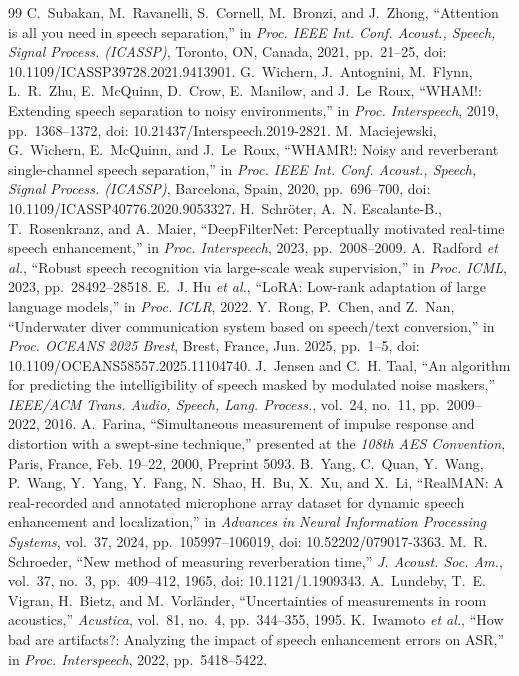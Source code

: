 \documentclass[conference]{IEEEtran}
\begin{document}
\begin{thebibliography}{99}
 C.~Subakan, M.~Ravanelli, S.~Cornell, M.~Bronzi, and J.~Zhong, ``Attention is all you need in speech separation,'' in \emph{Proc. IEEE Int. Conf. Acoust., Speech, Signal Process. (ICASSP)}, Toronto, ON, Canada, 2021, pp.~21--25, doi: 10.1109/ICASSP39728.2021.9413901.
 G.~Wichern, J.~Antognini, M.~Flynn, L.~R.~Zhu, E.~McQuinn, D.~Crow, E.~Manilow, and J.~Le~Roux, ``WHAM!: Extending speech separation to noisy environments,'' in \emph{Proc. Interspeech}, 2019, pp.~1368--1372, doi: 10.21437/Interspeech.2019-2821.
 M.~Maciejewski, G.~Wichern, E.~McQuinn, and J.~Le~Roux, ``WHAMR!: Noisy and reverberant single-channel speech separation,'' in \emph{Proc. IEEE Int. Conf. Acoust., Speech, Signal Process. (ICASSP)}, Barcelona, Spain, 2020, pp.~696--700, doi: 10.1109/ICASSP40776.2020.9053327.
 H.~Schr\"oter, A.~N. Escalante-B., T.~Rosenkranz, and A.~Maier,
``DeepFilterNet: Perceptually motivated real-time speech enhancement,'' in \emph{Proc. Interspeech},
2023, pp.~2008--2009.
 A.~Radford \emph{et al.}, ``Robust speech recognition via large-scale weak supervision,'' in \emph{Proc. ICML}, 2023,
pp.~28492--28518.
 E.~J. Hu \emph{et al.}, ``LoRA: Low-rank adaptation of large language models,'' in
\emph{Proc. ICLR}, 2022.
 Y.~Rong, P.~Chen, and Z.~Nan, ``Underwater diver communication system based on speech/text conversion,'' in \emph{Proc. OCEANS 2025 Brest}, Brest, France, Jun. 2025, pp.~1--5, doi: 10.1109/OCEANS58557.2025.11104740.
 J.~Jensen and C.~H. Taal, ``An algorithm for predicting the intelligibility of
speech masked by modulated noise maskers,'' \emph{IEEE/ACM Trans. Audio, Speech, Lang. Process.},
vol.~24, no.~11, pp.~2009--2022, 2016.
 A.~Farina, ``Simultaneous measurement of impulse response and distortion with a swept-sine technique,'' presented at the \emph{108th AES Convention}, Paris, France, Feb. 19--22, 2000, Preprint 5093.
 B.~Yang, C.~Quan, Y.~Wang, P.~Wang, Y.~Yang, Y.~Fang, N.~Shao, H.~Bu, X.~Xu, and X.~Li, ``RealMAN: A real-recorded and annotated microphone array dataset for dynamic speech enhancement and localization,'' in \emph{Advances in Neural Information Processing Systems}, vol.~37, 2024, pp.~105997--106019, doi: 10.52202/079017-3363.
 M.~R. Schroeder, ``New method of measuring reverberation time,'' \emph{J. Acoust. Soc. Am.}, vol.~37, no.~3, pp.~409--412, 1965, doi: 10.1121/1.1909343.
 A.~Lundeby, T.~E. Vigran, H.~Bietz, and M.~Vorl\"ander, ``Uncertainties of measurements in room acoustics,'' \emph{Acustica}, vol.~81, no.~4, pp.~344--355, 1995.
 K.~Iwamoto \emph{et al.}, ``How bad are artifacts?: Analyzing the impact of speech enhancement errors on ASR,'' in
\emph{Proc. Interspeech}, 2022, pp.~5418--5422.
\end{thebibliography}
\end{document}
